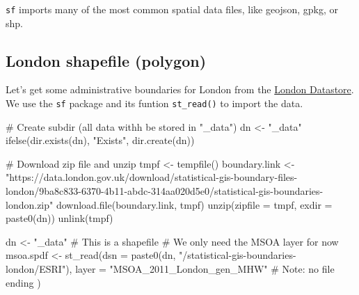 \documentclass[
  letterpaper,
]{scrbook}
\newenvironment{Shaded}{\begin{snugshade}}{\end{snugshade}}
\newcommand{\AttributeTok}[1]{\textcolor[rgb]{0.40,0.45,0.13}{#1}}
\newcommand{\CommentTok}[1]{\textcolor[rgb]{0.37,0.37,0.37}{#1}}
\newcommand{\FunctionTok}[1]{\textcolor[rgb]{0.28,0.35,0.67}{#1}}
\newcommand{\NormalTok}[1]{\textcolor[rgb]{0.00,0.23,0.31}{#1}}
\newcommand{\OtherTok}[1]{\textcolor[rgb]{0.00,0.23,0.31}{#1}}
\newcommand{\StringTok}[1]{\textcolor[rgb]{0.13,0.47,0.30}{#1}}
\begin{document}
\texttt{sf} imports many of the most common spatial data files, like
geojson, gpkg, or shp.

\hypertarget{london-shapefile-polygon}{%
\subsection{London shapefile (polygon)}\label{london-shapefile-polygon}}

Let's get some administrative boundaries for London from the
\href{https://data.london.gov.uk/dataset/statistical-gis-boundary-files-london}{London
Datastore}. We use the \texttt{sf} package and its funtion
\texttt{st\_read()} to import the data.

\begin{Shaded}
\begin{Highlighting}[]
\CommentTok{\# Create subdir (all data withh be stored in "\_data")}
\NormalTok{dn }\OtherTok{\textless{}{-}} \StringTok{"\_data"}
\FunctionTok{ifelse}\NormalTok{(}\FunctionTok{dir.exists}\NormalTok{(dn), }\StringTok{"Exists"}\NormalTok{, }\FunctionTok{dir.create}\NormalTok{(dn))}

\CommentTok{\# Download zip file and unzip}
\NormalTok{tmpf }\OtherTok{\textless{}{-}} \FunctionTok{tempfile}\NormalTok{()}
\NormalTok{boundary.link }\OtherTok{\textless{}{-}} \StringTok{"https://data.london.gov.uk/download/statistical{-}gis{-}boundary{-}files{-}london/9ba8c833{-}6370{-}4b11{-}abdc{-}314aa020d5e0/statistical{-}gis{-}boundaries{-}london.zip"}
\FunctionTok{download.file}\NormalTok{(boundary.link, tmpf)}
\FunctionTok{unzip}\NormalTok{(}\AttributeTok{zipfile =}\NormalTok{ tmpf, }\AttributeTok{exdir =} \FunctionTok{paste0}\NormalTok{(dn))}
\FunctionTok{unlink}\NormalTok{(tmpf)}
\end{Highlighting}
\end{Shaded}

\begin{Shaded}
\begin{Highlighting}[]
\NormalTok{dn }\OtherTok{\textless{}{-}} \StringTok{"\_data"}
\CommentTok{\# This is a shapefile}
\CommentTok{\# We only need the MSOA layer for now}
\NormalTok{msoa.spdf }\OtherTok{\textless{}{-}} \FunctionTok{st\_read}\NormalTok{(}\AttributeTok{dsn =} \FunctionTok{paste0}\NormalTok{(dn, }\StringTok{"/statistical{-}gis{-}boundaries{-}london/ESRI"}\NormalTok{),}
                     \AttributeTok{layer =} \StringTok{"MSOA\_2011\_London\_gen\_MHW"} \CommentTok{\# Note: no file ending}
\NormalTok{                     )}
\end{Highlighting}
\end{Shaded}
\end{document}
